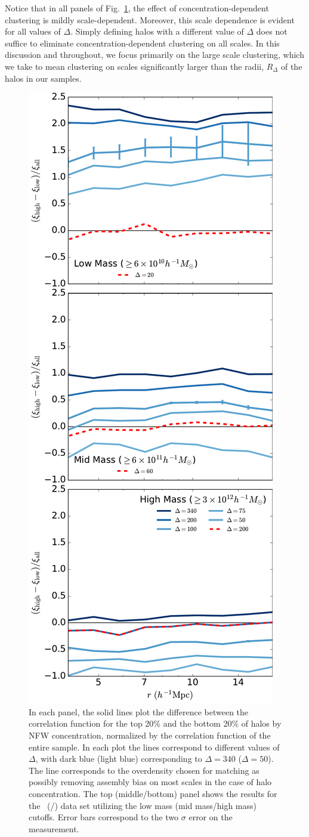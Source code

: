 \documentclass[usenatbib,fleqn]{mnras}
\begin{document}
Notice that in all panels of Fig.~\ref{fig:cc_cfcompare}, the effect of concentration-dependent clustering is
mildly scale-dependent. Moreover, this scale dependence is evident for all values of $\Delta$. Simply
defining halos with a different value of $\Delta$ does not suffice to eliminate concentration-dependent
clustering on all scales. In this discussion and throughout, we focus primarily on the large scale clustering,
which we take to mean clustering on scales significantly larger than the radii, $R_{\Delta}$ of the halos in our
samples.


\begin{figure}
	\centering
	\includegraphics[width=.4\textwidth]{all_cfcompare_cnfw.pdf}
	\caption{
In each panel, the solid lines plot the difference between the correlation function for the top
20\% and the bottom 20\% of halos by NFW concentration, normalized by the
correlation function of the entire sample. In each plot the lines correspond to different values of $\Delta$, with dark blue (light blue) corresponding to $\Delta = 340$ ($\Delta = 50$). The 
 line corresponds to the overdensity chosen for matching as possibly removing assembly bias on most scales in the case of halo concentration.
The top (middle/bottom) panel shows the results for the \simA \ (\simB /\simC) data 
set utilizing the low mass (mid mass/high mass) cutoffs. Error bars correspond to the two $\sigma$ error on the measurement.
}
\label{fig:cc_cfcompare}
\end{figure}
\end{document}
